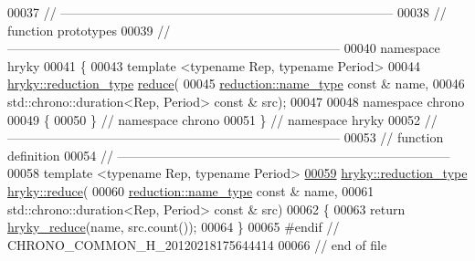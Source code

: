 \begin{DoxyCode}
00037 \textcolor{comment}{//
      ------------------------------------------------------------------------------}
00038 \textcolor{comment}{// function prototypes}
00039 \textcolor{comment}{//
      ------------------------------------------------------------------------------}
00040 \textcolor{keyword}{namespace }hryky
00041 \{
00043     \textcolor{keyword}{template} <\textcolor{keyword}{typename} Rep, \textcolor{keyword}{typename} Period>
00044     \hyperlink{classhryky_1_1_intrusive_ptr}{hryky::reduction_type} \hyperlink{namespacehryky_af41cb3af6766761da0ff21b84527a52c}{reduce}(
00045         \hyperlink{namespacehryky_1_1reduction_ac686c30a4c8d196bbd0f05629a6b921f}{reduction::name_type} \textcolor{keyword}{const} & name,
00046         std::chrono::duration<Rep, Period> \textcolor{keyword}{const} & src);
00047 
00048 \textcolor{keyword}{namespace }chrono
00049 \{
00050 \} \textcolor{comment}{// namespace chrono}
00051 \} \textcolor{comment}{// namespace hryky}
00052 \textcolor{comment}{//
      ------------------------------------------------------------------------------}
00053 \textcolor{comment}{// function definition}
00054 \textcolor{comment}{//
      ------------------------------------------------------------------------------}
00058 \textcolor{comment}{}\textcolor{keyword}{template} <\textcolor{keyword}{typename} Rep, \textcolor{keyword}{typename} Period>
\hypertarget{chrono__common_8h_source_l00059}{}\hyperlink{namespacehryky_af41cb3af6766761da0ff21b84527a52c}{00059} \hyperlink{classhryky_1_1_intrusive_ptr}{hryky::reduction_type} \hyperlink{namespacehryky_af41cb3af6766761da0ff21b84527a52c}{hryky::reduce}(
00060     \hyperlink{classhryky_1_1reduction_1_1_string}{reduction::name_type} \textcolor{keyword}{const} & name,
00061     std::chrono::duration<Rep, Period> \textcolor{keyword}{const} & src)
00062 \{
00063     \textcolor{keywordflow}{return} \hyperlink{reduction__common_8h_afc72326c9900838c5db40438318794dd}{hryky_reduce}(name, src.count());
00064 \}
00065 \textcolor{preprocessor}{#endif // CHRONO\_COMMON\_H\_20120218175644414}
00066 \textcolor{preprocessor}{}\textcolor{comment}{// end of file}
\end{DoxyCode}
